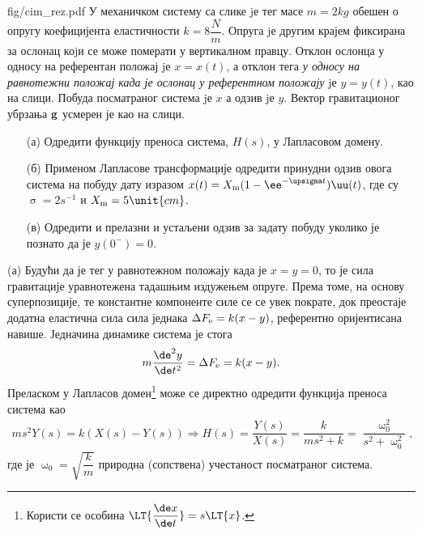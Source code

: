 \mnDifficult
\begin{slikaDesno}{fig/cim_rez.pdf}
    \PID
    У механичком систему са слике jе тег масе $m = 2\unit{kg}$ 
    обешен о опругу коефицијента
    еластичности $k = 8\unit{\dfrac Nm}$. 
    Опруга jе другим крајем фиксирана за ослонац коjи се може померати
    у вертикалном правцу. Отклон ослонца у односу на референтан положај jе $x = x(t)$,
    а отклон тега \textit{у односу на равнотежни положај када је ослонац у 
    референтном положају} jе
    $y = y(t)$, као на слици. Побуда посматраног система jе $x$ а одзив jе $y$.
    Вектор гравитационог убрзања $\bf g$ усмерен је као на слици.
    \begin{enumerate}
        \item[(а)] Одредити функцију преноса система, $H(s)$, у Лапласовом домену. 
    \end{enumerate}
\end{slikaDesno}
\begin{enumerate}
    \item[(б)] Применом Лапласове трансформације одредити
    принудни одзив овога система на побуду дату изразом
    $x(t) = X_{\rm m} (1 - \ee^{-\upsigma t}) \uu(t)$, где су 
    $\upsigma = 2 \unit{s^{-1}}$ и
    $X_{\rm m} = 5\unit{cm}$. 
    \item[(в)] Одредити и прелазни и устаљени одзив за задату побуду уколико је познато да је 
    $y(0^-) = 0$. 
\end{enumerate}

\RESENJE 
(а) Будући да је тег у равнотежном положају када је $x = y = 0$, то је сила гравитације уравнотежена тадашњим издужењем опруге. 
Према томе, на основу суперпозиције, те константне компоненте силе се се увек пократе, док преостаје додатна еластична сила
сила једнака $\Delta F_{\rm e} = k(x - y)$, референтно оријентисана навише. Једначина динамике система је стога 
\begin{equation}
    m \dfrac{\de^2 y}{\de t^2} = \Delta F_{\rm e} = k(x - y). 
\end{equation}
Преласком у Лапласов домен\footnote{Користи се особина $\LT{ \dfrac{\de x}{\de t} } = s \LT{x}$. } може се 
директно одредити функција преноса система као 
\begin{eqnarray}
    ms^2 Y(s) = k( X(s) - Y(s) ) 
    \Rightarrow
    H(s) = \dfrac{Y(s)}{X(s)} = \dfrac{k}{ms^2 + k} = \dfrac{\upomega_0^2}{s^2 + \upomega_0^2},
\end{eqnarray}
где је $\upomega_0 = \sqrt{\dfrac{k}{m}}$ природна (сопствена) учестаност посматраног система. 

